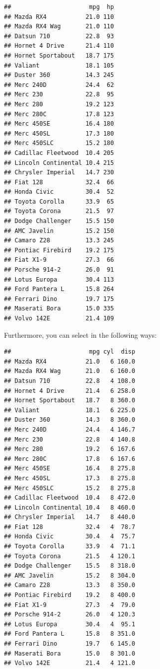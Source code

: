 \documentclass[]{report}
\newenvironment{Shaded}{\begin{snugshade}}{\end{snugshade}}
\newcommand{\KeywordTok}[1]{\textcolor[rgb]{0.13,0.29,0.53}{\textbf{#1}}}
\newcommand{\DecValTok}[1]{\textcolor[rgb]{0.00,0.00,0.81}{#1}}
\newcommand{\StringTok}[1]{\textcolor[rgb]{0.31,0.60,0.02}{#1}}
\newcommand{\CommentTok}[1]{\textcolor[rgb]{0.56,0.35,0.01}{\textit{#1}}}
\newcommand{\OperatorTok}[1]{\textcolor[rgb]{0.81,0.36,0.00}{\textbf{#1}}}
\newcommand{\NormalTok}[1]{#1}
\begin{document}
\begin{verbatim}
##                      mpg  hp
## Mazda RX4           21.0 110
## Mazda RX4 Wag       21.0 110
## Datsun 710          22.8  93
## Hornet 4 Drive      21.4 110
## Hornet Sportabout   18.7 175
## Valiant             18.1 105
## Duster 360          14.3 245
## Merc 240D           24.4  62
## Merc 230            22.8  95
## Merc 280            19.2 123
## Merc 280C           17.8 123
## Merc 450SE          16.4 180
## Merc 450SL          17.3 180
## Merc 450SLC         15.2 180
## Cadillac Fleetwood  10.4 205
## Lincoln Continental 10.4 215
## Chrysler Imperial   14.7 230
## Fiat 128            32.4  66
## Honda Civic         30.4  52
## Toyota Corolla      33.9  65
## Toyota Corona       21.5  97
## Dodge Challenger    15.5 150
## AMC Javelin         15.2 150
## Camaro Z28          13.3 245
## Pontiac Firebird    19.2 175
## Fiat X1-9           27.3  66
## Porsche 914-2       26.0  91
## Lotus Europa        30.4 113
## Ford Pantera L      15.8 264
## Ferrari Dino        19.7 175
## Maserati Bora       15.0 335
## Volvo 142E          21.4 109
\end{verbatim}

Furthermore, you can select in the following ways:

\begin{Shaded}
\end{Shaded}

\begin{verbatim}
##                      mpg cyl  disp
## Mazda RX4           21.0   6 160.0
## Mazda RX4 Wag       21.0   6 160.0
## Datsun 710          22.8   4 108.0
## Hornet 4 Drive      21.4   6 258.0
## Hornet Sportabout   18.7   8 360.0
## Valiant             18.1   6 225.0
## Duster 360          14.3   8 360.0
## Merc 240D           24.4   4 146.7
## Merc 230            22.8   4 140.8
## Merc 280            19.2   6 167.6
## Merc 280C           17.8   6 167.6
## Merc 450SE          16.4   8 275.8
## Merc 450SL          17.3   8 275.8
## Merc 450SLC         15.2   8 275.8
## Cadillac Fleetwood  10.4   8 472.0
## Lincoln Continental 10.4   8 460.0
## Chrysler Imperial   14.7   8 440.0
## Fiat 128            32.4   4  78.7
## Honda Civic         30.4   4  75.7
## Toyota Corolla      33.9   4  71.1
## Toyota Corona       21.5   4 120.1
## Dodge Challenger    15.5   8 318.0
## AMC Javelin         15.2   8 304.0
## Camaro Z28          13.3   8 350.0
## Pontiac Firebird    19.2   8 400.0
## Fiat X1-9           27.3   4  79.0
## Porsche 914-2       26.0   4 120.3
## Lotus Europa        30.4   4  95.1
## Ford Pantera L      15.8   8 351.0
## Ferrari Dino        19.7   6 145.0
## Maserati Bora       15.0   8 301.0
## Volvo 142E          21.4   4 121.0
\end{verbatim}
\end{document}
